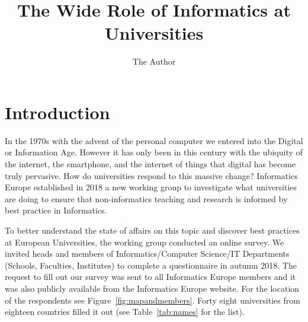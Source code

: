 \documentclass[11pt]{amsart}
\title{The Wide Role of Informatics at Universities}
\author{The Author}
\begin{document}
\maketitle
\section{Introduction}

In the 1970s with the advent of the personal computer we entered into the Digital or Information Age. However it has only been in this century with the ubiquity of the internet, the smartphone, and the internet of things that digital has become truly pervasive. How do universities respond to this massive change? Informatics Europe established in 2018 a new working group to investigate what universities are doing to ensure that non-informatics teaching and research is informed by best practice in Informatics.

To better understand the state of affairs on this topic and discover best practices at European Universities, the working group conducted an online survey. We invited heads and members of Informatics/Computer Science/IT Departments (Schools, Faculties, Institutes) to complete a questionnaire in autumn 2018. The request to fill out our survey was sent to all Informatics Europe members and it was also publicly available from the Informatics Europe website.  For the location of the respondents see Figure~\ref{fig:mapandmembers}.  Forty eight universities from eighteen countries filled it out (see Table~\ref{tab:names} for the list).
\end{document}
